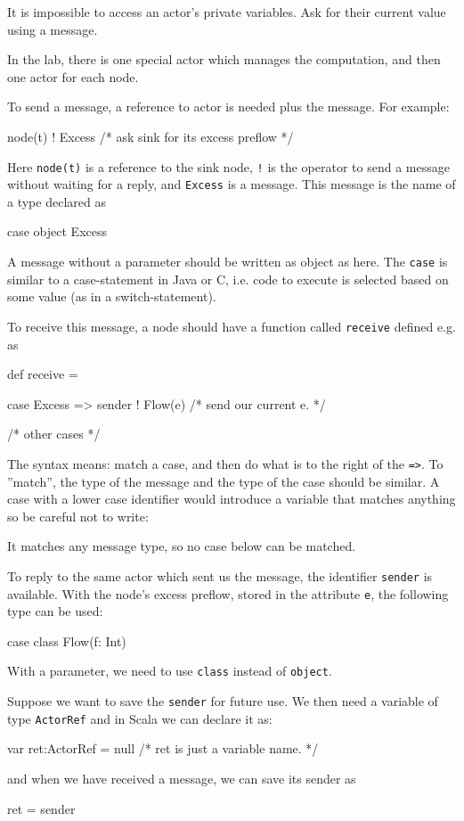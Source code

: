 \documentclass{forsete}
\begin{document}
It is impossible to access an actor's private variables. Ask for their current value using a message.

In the lab, there is one special actor which manages the computation, and then one actor for each node.

To send a message, a reference to actor is needed plus the message. For example:
\begin{ccode}
node(t) ! Excess	/* ask sink for its excess preflow */
\end{ccode}
Here {\tt node(t)} is a reference to the sink node, \verb.!. is the operator to send a message without 
waiting for a reply, and \verb.Excess. is a message. This message is the name of a type declared as
\begin{ccode}
case object Excess
\end{ccode}
A message without a parameter should be written as object as here. The \verb.case. is similar to 
a case-statement in Java or C, i.e. code to execute is selected based on some value (as in a switch-statement).

To receive this message, a node should have a function called {\tt receive} defined e.g. as
\begin{ccode}
def receive = {

case Excess => { sender ! Flow(e) /* send our current e. */ }

/* other cases */

}
\end{ccode}

The syntax means: match a case, and then do what is to the right of the \verb.=>..
To ''match'', the type of the message and the type of the case should be similar.
A case with a lower case identifier would introduce a variable that matches anything so be 
careful not to write:
\begin{ccode}
case excess => { sender ! Flow(e) /* reply with our current e. */
\end{ccode}
It matches any message type, so no case below can be matched.

To reply to the same actor which sent us the message, the identifier \verb.sender. is available.
With the node's excess preflow, stored in the attribute \verb.e., the following type can be used:
\begin{ccode}
case class Flow(f: Int)
\end{ccode}
With a parameter, we need to use \verb.class. instead of \verb.object..

Suppose we want to save the \verb.sender. for future use. We then need a variable
of type \verb.ActorRef. and in Scala we can declare it as:
\begin{ccode}
var	ret:ActorRef = null	/* ret is just a variable name. */
\end{ccode}
and when we have received a message, we can save its sender as
\begin{ccode}
ret = sender
\end{ccode}
\end{document}
